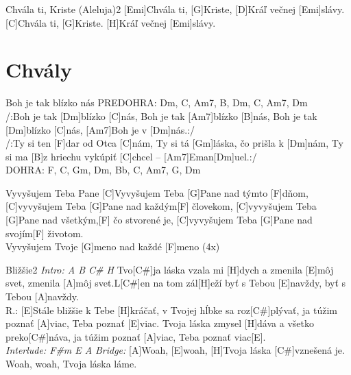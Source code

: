\documentclass[12pt]{article}
\begin{document}
\begin{song}{Chvála ti, Kriste (Aleluja)}{2}
[Emi]Chvála ti, [G]Kriste, [D]Kráľ večnej [Emi]slávy.
[C]Chvála ti, [G]Kriste. [H]Kráľ večnej [Emi]slávy.
\columnbreak
\end{song}

\newpage

\section{Chvály}

\begin{songgroup}{2}
\begin{groupitem}{Boh je tak blízko nás}
	PREDOHRA: 
	Dm, C, Am7, B, 
	Dm, C, Am7, Dm
	\\
	/:Boh je tak [Dm]blízko [C]nás, 
	Boh je tak [Am7]blízko [B]nás, 
	Boh je tak [Dm]blízko [C]nás, 
	[Am7]Boh je v [Dm]nás.:/ 
	\\
	/:Ty si ten [F]dar od Otca [C]nám, 
	Ty si tá [Gm]láska, čo prišla k [Dm]nám, 
	Ty si ma [B]z hriechu vykúpiť [C]chcel
	– [Am7]Eman[Dm]uel.:/
	\\
	DOHRA: 
	F, C, Gm, Dm, Bb, 
	C, Am7, G, Dm
\end{groupitem}

\columnbreak
\begin{groupitem}{Vyvyšujem Teba Pane}
	[C]Vyvyšujem Teba [G]Pane 
	nad týmto [F]dňom,
	[C]vyvyšujem Teba [G]Pane 
	nad každým[F] človekom, 
	[C]vyvyšujem Teba [G]Pane 
	nad všetkým,[F] čo stvorené je,
	[C]vyvyšujem Teba [G]Pane
	nad svojím[F] životom.
	\\
	[C]Vyvyšujem Tvoje [G]meno 
	nad každé [F]meno (4x)
\end{groupitem}

\end{songgroup}

\begin{song}{Bližšie}{2}
	\textit{\color{gray}Intro: A B C\# H}
	Tvo[C#]ja láska vzala mi [H]dych a zmenila [E]môj svet,
	zmenila [A]môj svet.L[C#]en na tom zál[H]eží
	byť s Tebou [E]navždy, byť s Tebou [A]navždy.
	\\
	R.: [E]Stále bližšie k Tebe [H]kráčať, v Tvojej hĺbke sa roz[C#]plývať,
	ja túžim poznať [A]viac, Teba poznať [E]viac.
	\columnbreak
	Tvoja láska zmysel [H]dáva a všetko preko[C#]náva,
	ja túžim poznať [A]viac, Teba poznať viac[E].
	\\
	\textit{\color{gray}Interlude: F\#m E A}
	\textit{\color{gray}Bridge:}
	[A]Woah, [E]woah, [H]Tvoja láska [C#]vznešená je.
	Woah, woah, Tvoja láska láme.
\end{song}
\end{document}
